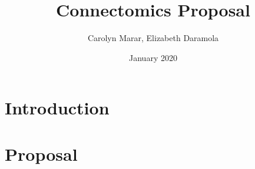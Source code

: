 \documentclass{article}
\title{Connectomics Proposal}
\author{Carolyn Marar, Elizabeth Daramola }
\date{January 2020}
\begin{document}
\maketitle

\section{Introduction}

\section{Proposal}
\end{document}
